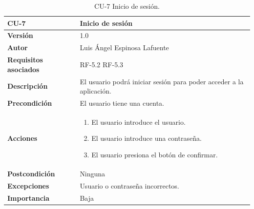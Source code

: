 \begin{table}[p]
	\centering
	\begin{tabularx}{\linewidth}{ p{} p{} }
		\toprule
		\textbf{CU-7}    & \textbf{Inicio de sesión}\\
		\toprule
		\textbf{Versión}              & 1.0    \\
		\textbf{Autor}                &  Luis Ángel Espinosa Lafuente \\
		\textbf{Requisitos asociados} & RF-5.2 RF-5.3\\
		\textbf{Descripción}          & El usuario podrá iniciar sesión para poder acceder a la aplicación.\\
		\textbf{Precondición}         & El usuario tiene una cuenta.\\
		\textbf{Acciones}             &
		\begin{enumerate}
			\def\labelenumi{\arabic{enumi}.}
			\tightlist
			\item El usuario introduce el usuario.
			\item El usuario introduce una contraseña.
			\item El usuario presiona el botón de confirmar.
		\end{enumerate}\\
		\textbf{Postcondición}        & Ninguna \\
		\textbf{Excepciones}          & Usuario o contraseña incorrectos. \\
		\textbf{Importancia}          & Baja \\
		\bottomrule
	\end{tabularx}
	\caption{CU-7 Inicio de sesión.}
\end{table}


